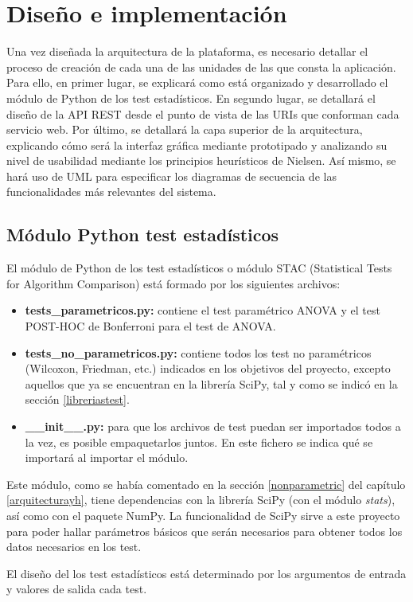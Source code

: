 \chapter{Diseño e implementación}
Una vez diseñada la arquitectura de la plataforma, es necesario detallar el proceso de creación de cada una de las unidades de las que consta la aplicación. Para ello, en primer lugar, se explicará como está organizado y desarrollado el módulo de Python de los test estadísticos. En segundo lugar, se detallará el diseño de la API REST desde el punto de vista de las URIs que conforman cada servicio web. Por último, se detallará la capa superior de la arquitectura, explicando cómo será la interfaz gráfica mediante prototipado y analizando su nivel de usabilidad mediante los principios heurísticos de Nielsen. Así mismo, se hará uso de UML para especificar los diagramas de secuencia de las funcionalidades más relevantes del sistema.

\section{Módulo Python test estadísticos} \label{dis_py}
El módulo de Python de los test estadísticos o módulo STAC (Statistical Tests for Algorithm Comparison) está formado por los siguientes archivos:
\begin{itemize}
\item \textbf{tests\_parametricos.py:} contiene el test paramétrico ANOVA y el test POST-HOC de Bonferroni para el test de ANOVA.
\item \textbf{tests\_no\_parametricos.py:} contiene todos los test no paramétricos (Wilcoxon, Friedman, etc.) indicados en los objetivos del proyecto, excepto aquellos que ya se encuentran en la librería SciPy, tal y como se indicó en la sección \ref{libreriastest}.
\item \textbf{\_\_init\_\_.py:} para que los archivos de test puedan ser importados todos a la vez, es posible empaquetarlos juntos. En este fichero se indica qué se importará al importar el módulo.
\end{itemize}
Este módulo, como se había comentado en la sección \ref{nonparametric} del capítulo \ref{arquitecturayh}, tiene dependencias con la librería SciPy (con el módulo \textit{stats}), así como con el paquete NumPy. La funcionalidad de SciPy sirve a este proyecto para poder hallar parámetros básicos que serán necesarios para obtener todos los datos necesarios en los test.

El diseño del los test estadísticos está determinado por los argumentos de entrada y valores de salida cada test.

